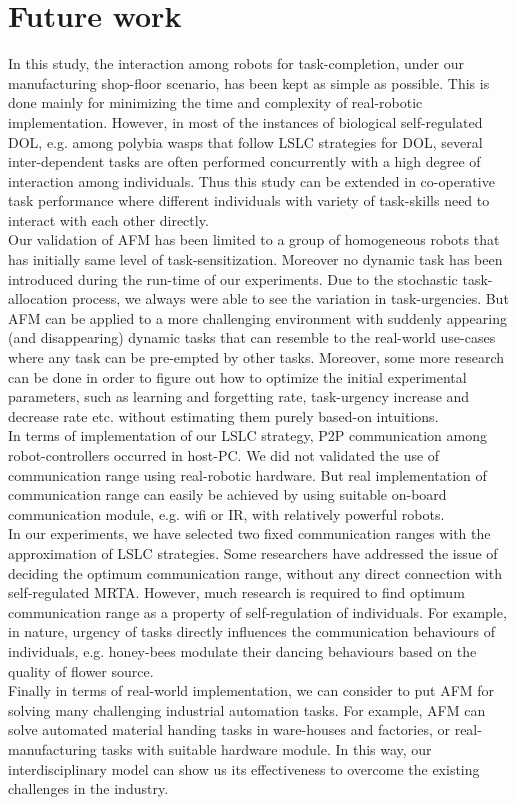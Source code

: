 \section{Future work}
In this study, the interaction among robots for task-completion, under our manufacturing shop-floor scenario, has been kept as simple as possible. This is done mainly for minimizing the time and complexity of real-robotic implementation. However, in most of the instances of biological self-regulated DOL, e.g. among polybia wasps that follow LSLC strategies for DOL, several inter-dependent tasks are often performed concurrently with a high degree of interaction among individuals. Thus this study can be extended in co-operative task performance where different individuals with variety of task-skills need to interact with each other directly. \\
Our validation of AFM has been limited to a group of homogeneous robots that has initially same level of task-sensitization. Moreover no dynamic task has been introduced during the run-time of our experiments. Due to the stochastic task-allocation process, we always were able to see the  variation in task-urgencies. But AFM can be applied to a more challenging environment with suddenly appearing (and disappearing) dynamic tasks that can resemble to the real-world use-cases where any task can be pre-empted by other tasks. Moreover, some more research can be done in order to figure out how to optimize the initial experimental parameters, such as learning and forgetting rate,  task-urgency increase and decrease rate etc. without estimating them purely based-on intuitions. \\
In terms of implementation of our LSLC strategy, P2P communication among robot-controllers occurred in host-PC. We did not validated the use of communication range  using real-robotic hardware. But real implementation of communication range can easily be achieved by using suitable on-board communication module, e.g. wifi or IR, with  relatively powerful robots.\\ 
In our experiments, we have selected two fixed communication ranges with the approximation of LSLC strategies. Some researchers have addressed the issue of deciding the optimum communication range,  without any direct connection with self-regulated MRTA. However, much research is required to find optimum communication range as a property of self-regulation of individuals. For example, in nature, urgency of tasks directly influences the communication behaviours of individuals, e.g. honey-bees modulate their dancing behaviours based on the quality of flower source.\\
Finally in terms of real-world implementation, we can consider to put AFM for solving many challenging industrial automation tasks. For example, AFM can solve automated material handing tasks in ware-houses and factories, or real-manufacturing tasks with suitable hardware module. In this way, our interdisciplinary model can show us its effectiveness to overcome the existing challenges in the industry.